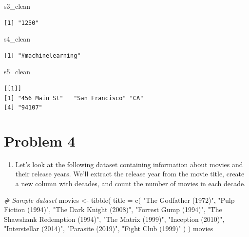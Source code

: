 \documentclass[
]{book}
\newenvironment{Shaded}{\begin{snugshade}}{\end{snugshade}}
\newcommand{\AttributeTok}[1]{\textcolor[rgb]{0.77,0.63,0.00}{#1}}
\newcommand{\CommentTok}[1]{\textcolor[rgb]{0.56,0.35,0.01}{\textit{#1}}}
\newcommand{\FunctionTok}[1]{\textcolor[rgb]{0.00,0.00,0.00}{#1}}
\newcommand{\NormalTok}[1]{#1}
\newcommand{\OtherTok}[1]{\textcolor[rgb]{0.56,0.35,0.01}{#1}}
\newcommand{\StringTok}[1]{\textcolor[rgb]{0.31,0.60,0.02}{#1}}
\providecommand{\tightlist}{%
  \setlength{\itemsep}{0pt}\setlength{\parskip}{0pt}}
\begin{document}
\begin{Shaded}
\begin{Highlighting}[]
\NormalTok{s3\_clean}
\end{Highlighting}
\end{Shaded}

\begin{verbatim}
[1] "1250"
\end{verbatim}

\begin{Shaded}
\begin{Highlighting}[]
\NormalTok{s4\_clean}
\end{Highlighting}
\end{Shaded}

\begin{verbatim}
[1] "#machinelearning"
\end{verbatim}

\begin{Shaded}
\begin{Highlighting}[]
\NormalTok{s5\_clean}
\end{Highlighting}
\end{Shaded}

\begin{verbatim}
[[1]]
[1] "456 Main St"   "San Francisco" "CA"           
[4] "94107"        
\end{verbatim}

\hypertarget{problem-4}{%
\section{Problem 4}\label{problem-4}}

\begin{enumerate}
\def\labelenumi{\alph{enumi}.}
\tightlist
\item
  Let's look at the following dataset containing information about movies and their release years. We'll extract the release year from the movie title, create a new column with decades, and count the number of movies in each decade.
\end{enumerate}

\begin{Shaded}
\begin{Highlighting}[]
\CommentTok{\# Sample dataset}
\NormalTok{movies }\OtherTok{\textless{}{-}} \FunctionTok{tibble}\NormalTok{(}
  \AttributeTok{title =} \FunctionTok{c}\NormalTok{(}
    \StringTok{"The Godfather (1972)"}\NormalTok{, }\StringTok{"Pulp Fiction (1994)"}\NormalTok{, }\StringTok{"The Dark Knight (2008)"}\NormalTok{,}
    \StringTok{"Forrest Gump (1994)"}\NormalTok{, }\StringTok{"The Shawshank Redemption (1994)"}\NormalTok{, }\StringTok{"The Matrix (1999)"}\NormalTok{,}
    \StringTok{"Inception (2010)"}\NormalTok{, }\StringTok{"Interstellar (2014)"}\NormalTok{, }\StringTok{"Parasite (2019)"}\NormalTok{, }\StringTok{"Fight Club (1999)"}
\NormalTok{  )}
\NormalTok{)}
\NormalTok{movies}
\end{Highlighting}
\end{Shaded}
\end{document}
